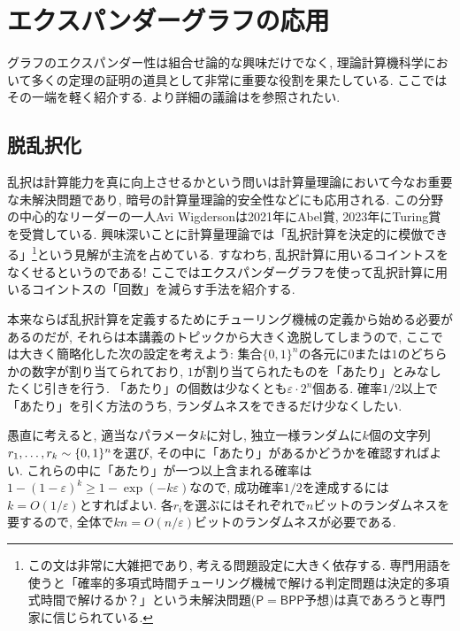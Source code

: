 \section{エクスパンダーグラフの応用} \label{sec:expander graph application}
グラフのエクスパンダー性は組合せ論的な興味だけでなく,
理論計算機科学において多くの定理の証明の道具として非常に重要な役割を果たしている.
ここではその一端を軽く紹介する.
より詳細の議論は\cite{HLW06}を参照されたい.
%
\subsection{脱乱択化}
乱択は計算能力を真に向上させるかという問いは計算量理論において今なお重要な未解決問題であり,
暗号の計算量理論的安全性などにも応用される.
この分野の中心的なリーダーの一人Avi Wigdersonは2021年にAbel賞, 2023年にTuring賞を受賞している.
興味深いことに計算量理論では「乱択計算を決定的に模倣できる」\footnote{この文は非常に大雑把であり, 考える問題設定に大きく依存する. 専門用語を使うと「確率的多項式時間チューリング機械で解ける判定問題は決定的多項式時間で解けるか？」という未解決問題($\mathsf{P}=\mathsf{BPP}$予想)は真であろうと専門家に信じられている.}という見解が主流を占めている.
すなわち, 乱択計算に用いるコイントスをなくせるというのである!
ここではエクスパンダーグラフを使って乱択計算に用いるコイントスの「回数」を減らす手法\cite{AKS87}を紹介する.

本来ならば乱択計算を定義するためにチューリング機械の定義から始める必要があるのだが,
それらは本講義のトピックから大きく逸脱してしまうので,
ここでは大きく簡略化した次の設定を考えよう:
集合$\{0,1\}^n$の各元に$0$または$1$のどちらかの数字が割り当てられており, $1$が割り当てられたものを「あたり」とみなしたくじ引きを行う.
「あたり」の個数は少なくとも$\varepsilon\cdot 2^n$個ある.
確率$1/2$以上で「あたり」を引く方法のうち, ランダムネスをできるだけ少なくしたい.



愚直に考えると, 適当なパラメータ$k$に対し,
独立一様ランダムに$k$個の文字列$r_1,\dots,r_k\sim\{0,1\}^n$を選び, その中に「あたり」があるかどうかを確認すればよい.
これらの中に「あたり」が一つ以上含まれる確率は$1-(1-\varepsilon)^k \ge 1-\exp(-k\varepsilon)$なので, 成功確率$1/2$を達成するには$k=O(1/\varepsilon)$とすればよい.
各$r_i$を選ぶにはそれぞれで$n$ビットのランダムネスを要するので, 全体で$kn = O(n/\varepsilon)$ビットのランダムネスが必要である.

